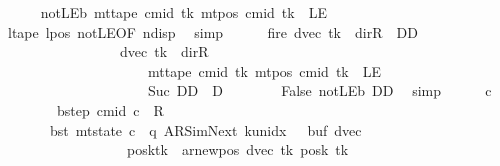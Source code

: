 \begin{isabellebody}
\ \ \ \ \isamarkupfalse%
\ notLE{\isacharunderscore}{\kern0pt}b{\isacharcolon}{\kern0pt}\ {\isachardoublequoteopen}mt{\isacharunderscore}{\kern0pt}tape\ cmid\ tk\ {\isacharparenleft}{\kern0pt}mt{\isacharunderscore}{\kern0pt}pos\ cmid\ tk{\isacharparenright}{\kern0pt}\ {\isasymnoteq}\ LE{}{\isachardoublequoteclose}\isanewline
\ \ \ \ \ \ \isamarkupfalse%
\ ltape\ lpos\ notLE{\isacharbrackleft}{\kern0pt}OF\ ndisp{\isacharbrackright}{\kern0pt}\ \isamarkupfalse%
\ simp\isanewline
\ \ \ \ \isamarkupfalse%
\ fire{\isacharcolon}{\kern0pt}\ {\isachardoublequoteopen}{\isacharparenleft}{\kern0pt}dvec\ tk\ {\isacharequal}{\kern0pt}\ dir{\isachardot}{\kern0pt}R\ {\isasymand}\ DD\ {\isacharequal}{\kern0pt}\ {}{\isacharparenright}{\kern0pt}\isanewline
\ \ \ \ \ \ \ \ \ \ \ \ \ \ \ \ {\isasymor}\ {\isacharparenleft}{\kern0pt}dvec\ tk\ {\isasymnoteq}\ dir{\isachardot}{\kern0pt}R\isanewline
\ \ \ \ \ \ \ \ \ \ \ \ \ \ \ \ \ \ \ \ {\isasymand}\ mt{\isacharunderscore}{\kern0pt}tape\ cmid\ tk\ {\isacharparenleft}{\kern0pt}mt{\isacharunderscore}{\kern0pt}pos\ cmid\ tk{\isacharparenright}{\kern0pt}\ {\isasymnoteq}\ LE{}\isanewline
\ \ \ \ \ \ \ \ \ \ \ \ \ \ \ \ \ \ \ \ {\isasymand}\ Suc\ DD\ {\isacharequal}{\kern0pt}\ {\isacharquery}{\kern0pt}D{\isacharparenright}{\kern0pt}{\isachardoublequoteclose}\isanewline
\ \ \ \ \ \ \isamarkupfalse%
\ False\ notLE{\isacharunderscore}{\kern0pt}b\ DD\ \isamarkupfalse%
\ simp\isanewline
\ \ \ \ \isamarkupfalse%
\ c{\isacharprime}{\kern0pt}\ \isanewline
\ \ \ \ \ \ \ \ bstep{\isacharcolon}{\kern0pt}\ {\isachardoublequoteopen}{\isacharparenleft}{\kern0pt}cmid{\isacharcomma}{\kern0pt}\ c{\isacharprime}{\kern0pt}{\isacharparenright}{\kern0pt}\ {\isasymin}\ {\isacharquery}{\kern0pt}R{\isachardoublequoteclose}\isanewline
\ \ \ \ \ \ \ bst{\isacharcolon}{\kern0pt}\ {\isachardoublequoteopen}mt{\isacharunderscore}{\kern0pt}state\ c{\isacharprime}{\kern0pt}\ {\isacharequal}{\kern0pt}\ {\isacharparenleft}{\kern0pt}q{\isacharcomma}{\kern0pt}\ AR{\isacharunderscore}{\kern0pt}SimNext{\isacharcomma}{\kern0pt}\ k{\isacharunderscore}{\kern0pt}unidx\ {}{\isacharcomma}{\kern0pt}\ {}{\isacharcomma}{\kern0pt}\ buf{\isacharcomma}{\kern0pt}\ dvec{\isacharcomma}{\kern0pt}\isanewline
\ \ \ \ \ \ \ \ \ \ \ \ \ \ \ \ \ \ posk{\isacharparenleft}{\kern0pt}tk\ {\isacharcolon}{\kern0pt}{\isacharequal}{\kern0pt}\ ar{\isacharunderscore}{\kern0pt}newpos\ {\isacharparenleft}{\kern0pt}dvec\ tk{\isacharparenright}{\kern0pt}\ {\isacharparenleft}{\kern0pt}posk\ tk{\isacharparenright}{\kern0pt}{\isacharparenright}{\kern0pt}{\isacharparenright}{\kern0pt}{\isachardoublequoteclose}\isanewline

\end{isabellebody}
